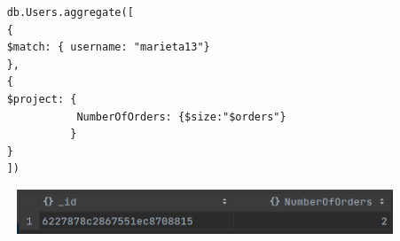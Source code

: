 \begin{verbatim}
    db.Users.aggregate([
    {
    $match: { username: "marieta13"}
    },
    {
    $project: {
               NumberOfOrders: {$size:"$orders"}
              }
    }
    ])
\end{verbatim}

\begin{figure}[htpb!]
    \centering
    \includegraphics[width=400pt]{figures/orders.png}
\end{figure}